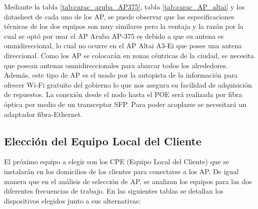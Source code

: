 \documentclass[11pt,a4paper]{article}
\begin{document}
\begin{table}[htbp]
\caption{características AP Altai A3-Ei.}
\label{tab:carac_AP_altai}
\end{table}


Mediante la tabla \ref{tab:carac_aruba_AP375}, tabla \ref{tab:carac_AP_altai}  y los datasheet de cada uno de los AP, se puede observar que las especificaciones técnicas de los dos equipos son muy similares pero la ventaja y la razón por la cual se optó por usar el AP Aruba AP-375 es debido a que su antena es omnidireccional, lo cual no ocurre en el AP Altai A3-Ei que posee una antena direccional. 
Como los AP se colocarán en zonas céntricas de la ciudad, se necesita que posean antenas omnidireccionales para abarcar todos los alrededores. 
Además, este tipo de AP es el usado por la autopista de la información para ofrecer  Wi-Fi gratuito del gobierno lo que nos asegura su facilidad de adquisición de repuestos. 
La conexión desde el nodo hasta el POE será realizada por fibra óptica por medio de un transceptor SFP. Para poder acoplarse se necesitará un adaptador fibra-Ethernet.

\subsection{Elección del Equipo Local del Cliente}

El próximo equipo a elegir son los CPE (Equipo Local del Cliente) que se instalarán en los domicilios de los clientes para conectarse a los AP. 
De igual manera que en el análisis de selección de AP, se analizan los equipos para las dos diferentes frecuencias de trabajo. 
En las siguientes tablas se detallan los dispositivos elegidos junto a sus alternativas:
\end{document}
